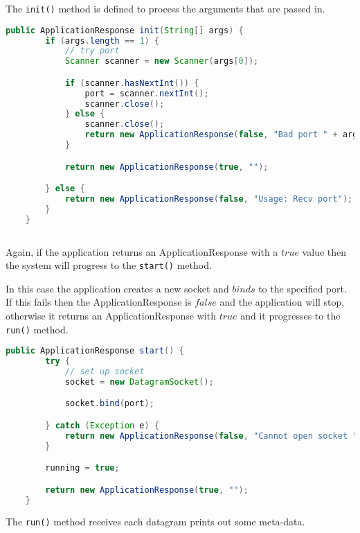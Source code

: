 \noindent  The \texttt{init()} method is defined to process the
arguments that are passed in.

\begin{lstlisting}[language=java,frame=single]
    public ApplicationResponse init(String[] args) {
        if (args.length == 1) {
            // try port
            Scanner scanner = new Scanner(args[0]);

            if (scanner.hasNextInt()) {
                port = scanner.nextInt();
                scanner.close();
            } else {
            	scanner.close();
                return new ApplicationResponse(false, "Bad port " + args[1]);
            }

            return new ApplicationResponse(true, "");

        } else {
            return new ApplicationResponse(false, "Usage: Recv port");
        }
    }
    
\end{lstlisting}


\noindent Again, if the application returns an ApplicationResponse with a
$true$ value then the system will progress to the \texttt{start()}
method.

In this case the application creates a new socket and
$binds$ to the specified port.
If this fails then the ApplicationResponse is
$false$ and the application will stop, otherwise it returns an
ApplicationResponse with $true$ and it progresses to the
\texttt{run()} method.

\begin{lstlisting}[language=java,frame=single]
    public ApplicationResponse start() {
        try {
            // set up socket
            socket = new DatagramSocket();

            socket.bind(port);

        } catch (Exception e) {
            return new ApplicationResponse(false, "Cannot open socket " + e.getMessage());
        }

        running = true;

        return new ApplicationResponse(true, "");
    }

\end{lstlisting}


\noindent The \texttt{run()} method receives each datagram 
prints out some meta-data.

